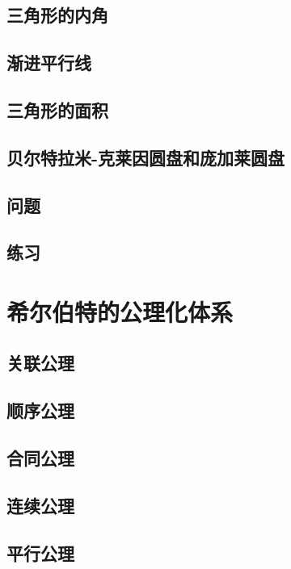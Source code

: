 \documentclass[cn,fancy,blue,11pt]{elegantbook}
\begin{document}
\section{三角形的内角}

\section{渐进平行线}

\section{三角形的面积}

\section{贝尔特拉米-克莱因圆盘和庞加莱圆盘}

\section{问题}

\section{练习}

\chapter{希尔伯特的公理化体系}

\section{关联公理}

\section{顺序公理}

\section{合同公理}

\section{连续公理}

\section{平行公理}
\end{document}
